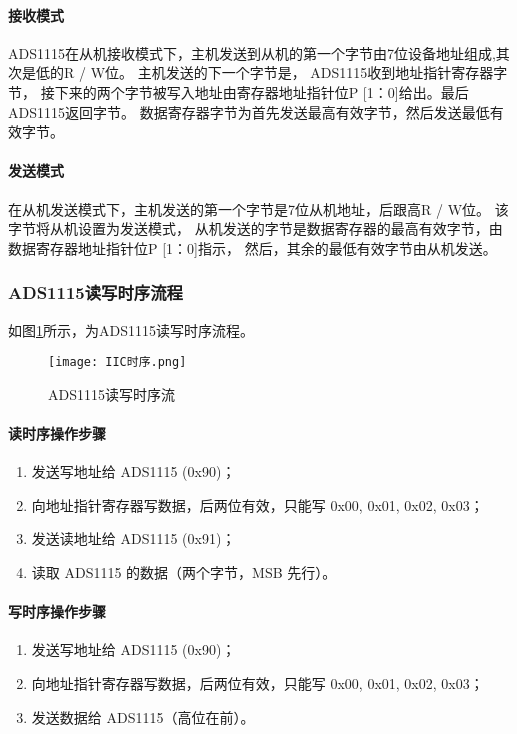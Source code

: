 \documentclass[lang=cn,11pt,a4paper]{elegantpaper}
\begin{document}
\paragraph{接收模式}
ADS1115在从机接收模式下，主机发送到从机的第一个字节由7位设备地址组成,其次是低的R / W位。 主机发送的下一个字节是， ADS1115收到地址指针寄存器字节， 接下来的两个字节被写入地址由寄存器地址指针位P [1：0]给出。最后ADS1115返回字节。 数据寄存器字节为首先发送最高有效字节，然后发送最低有效字节。

\paragraph{发送模式}
在从机发送模式下，主机发送的第一个字节是7位从机地址，后跟高R / W位。 该字节将从机设置为发送模式， 从机发送的字节是数据寄存器的最高有效字节，由数据寄存器地址指针位P [1：0]指示， 然后，其余的最低有效字节由从机发送。

\subsubsection{ADS1115读写时序流程}
如图\ref{fig:IICTimeSequence}所示，为ADS1115读写时序流程。
\begin{figure}[!htb]
  \centering
  \texttt{[image: IIC时序.png]}
  \caption{ADS1115读写时序流}
  \label{fig:IICTimeSequence}
\end{figure}

\paragraph{读时序操作步骤}
\begin{enumerate}
  \item 发送写地址给 ADS1115 (0x90)；
  \item 向地址指针寄存器写数据，后两位有效，只能写 0x00, 0x01, 0x02, 0x03；
  \item 发送读地址给 ADS1115 (0x91)；
  \item 读取 ADS1115 的数据（两个字节，MSB 先行）。
\end{enumerate}

\paragraph{写时序操作步骤}
\begin{enumerate}
  \item 发送写地址给 ADS1115 (0x90)；
  \item 向地址指针寄存器写数据，后两位有效，只能写 0x00, 0x01, 0x02, 0x03；
  \item 发送数据给 ADS1115（高位在前）。
\end{enumerate}
\end{document}
